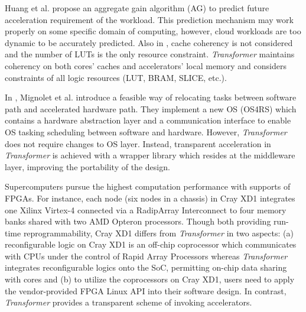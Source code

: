 Huang et al. propose an aggregate gain algorithm (AG)
\cite{Huang:2009hs} to predict future acceleration requirement of the
workload. This prediction mechanism may work properly on some specific
domain of computing, however, cloud workloads are too dynamic to be
accurately predicted. Also in \cite{Huang:2009hs}, cache coherency is not considered and the
number of LUTs is the only resource constraint. {\em Transformer}
maintains coherency on both cores' caches and accelerators' local
memory and considers constraints of all logic resources (LUT, BRAM,
SLICE, etc.).


In \cite{Mignolet:2003gr}, Mignolet et al. introduce a feasible way of
relocating tasks between software path and accelerated hardware
path. They implement a new OS (OS4RS) which contains a hardware
abstraction layer and a communication interface to enable OS tasking
scheduling between software and hardware. 
However, {\em Transformer} does not require changes to OS
layer. Instead, transparent acceleration in {\em Transformer} is
achieved with a wrapper library which resides at the middleware layer,
improving the portability of the design.


Supercomputers pursue the highest computation performance
\cite{Ulmer:2005vh} with supports of FPGAs. For instance, each node
(six nodes in a chassis) in Cray XD1 integrates one Xilinx Virtex-4
connected via a RadipArray Interconnect to four memory banks shared
with two AMD Opteron processors. Though both providing run-time
reprogrammability, Cray XD1 differs from {\em Transformer} in two
aspects: (a) reconfigurable logic on Cray XD1 is an off-chip
coprocessor which communicates with CPUs under the control of Rapid
Array Processors whereas {\em Transformer} integrates reconfigurable
logics onto the SoC, permitting on-chip data sharing with cores and (b)
to utilize the coprocessors on Cray XD1, users need to apply the
vendor-provided FPGA Linux API into their software design. In
contrast, {\em Transformer} provides a transparent scheme of invoking
accelerators.

